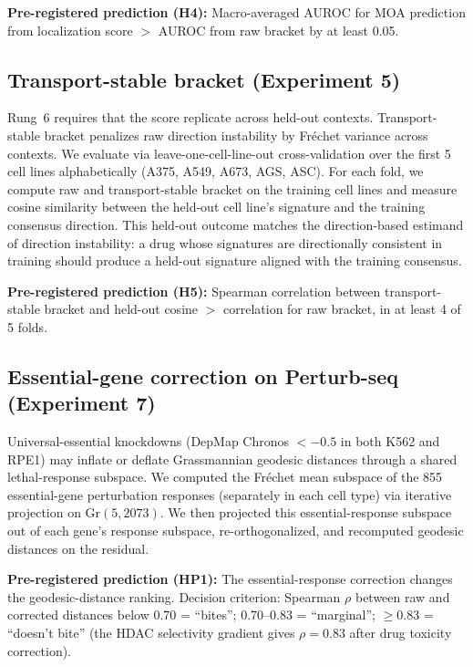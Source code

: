 \documentclass{article}
\begin{document}
\textbf{Pre-registered prediction (H4):} Macro-averaged AUROC for MOA
prediction from localization score $>$ AUROC from raw bracket by at least
0.05.

\subsection{Transport-stable bracket (Experiment 5)}

Rung~6 requires that the score replicate across held-out contexts.
Transport-stable bracket penalizes raw direction instability by Fr\'{e}chet
variance across contexts. We evaluate via leave-one-cell-line-out
cross-validation over the first 5 cell lines alphabetically (A375, A549,
A673, AGS, ASC). For each fold, we compute raw and transport-stable bracket
on the training cell lines and measure cosine similarity between the
held-out cell line's signature and the training consensus direction. This
held-out outcome matches the direction-based estimand of direction
instability: a drug whose signatures are directionally consistent in
training should produce a held-out signature aligned with the training
consensus.

\textbf{Pre-registered prediction (H5):} Spearman correlation between
transport-stable bracket and held-out cosine $>$ correlation for raw bracket,
in at least 4 of 5 folds.

\subsection{Essential-gene correction on Perturb-seq (Experiment 7)}

Universal-essential knockdowns (DepMap Chronos $< -0.5$ in both K562 and
RPE1) may inflate or deflate Grassmannian geodesic distances through a
shared lethal-response subspace. We computed the Fr\'echet mean subspace of
the 855 essential-gene perturbation responses (separately in each cell type)
via iterative projection on Gr$(5, 2073)$. We then projected this
essential-response subspace out of each gene's response subspace,
re-orthogonalized, and recomputed geodesic distances on the residual.

\textbf{Pre-registered prediction (HP1):} The essential-response correction
changes the geodesic-distance ranking. Decision criterion: Spearman $\rho$
between raw and corrected distances below 0.70 = ``bites''; 0.70--0.83 =
``marginal''; $\geq 0.83$ = ``doesn't bite'' (the HDAC selectivity
gradient gives $\rho = 0.83$ after drug toxicity correction).
\end{document}
